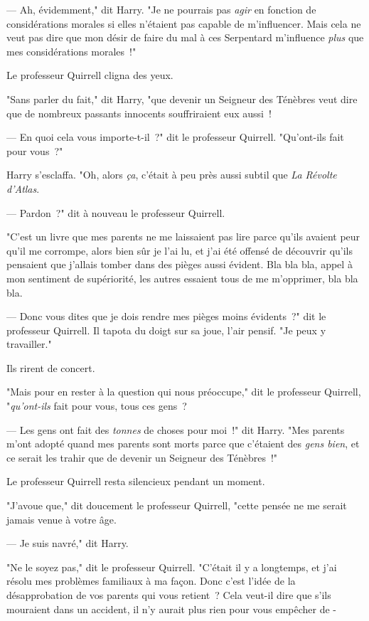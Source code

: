 --- Ah, évidemment," dit Harry. "Je ne pourrais pas \emph{agir} en fonction de considérations morales si elles n'étaient pas capable de m'influencer. Mais cela ne veut pas dire que mon désir de faire du mal à ces Serpentard m'influence \emph{plus} que mes considérations morales~!"

Le professeur Quirrell cligna des yeux.

"Sans parler du fait," dit Harry, "que devenir un Seigneur des Ténèbres veut dire que de nombreux passants innocents souffriraient eux aussi~!

--- En quoi cela vous importe-t-il~?" dit le professeur Quirrell. "Qu'ont-ils fait pour vous~?"

Harry s'esclaffa. "Oh, alors \emph{ça}, c'était à peu près aussi subtil que \emph{La Révolte d'Atlas}.

--- Pardon~?" dit à nouveau le professeur Quirrell.

"C'est un livre que mes parents ne me laissaient pas lire parce qu'ils avaient peur qu'il me corrompe, alors bien sûr je l'ai lu, et j'ai été offensé de découvrir qu'ils pensaient que j'allais tomber dans des pièges aussi évident. Bla bla bla, appel à mon sentiment de supériorité, les autres essaient tous de me m'opprimer, bla bla bla.

--- Donc vous dites que je dois rendre mes pièges moins évidents~?" dit le professeur Quirrell. Il tapota du doigt sur sa joue, l'air pensif. "Je peux y travailler."

Ils rirent de concert.

"Mais pour en rester à la question qui nous préoccupe," dit le professeur Quirrell, "\emph{qu'ont-ils} fait pour vous, tous ces gens~?

--- Les gens ont fait des \emph{tonnes} de choses pour moi~!" dit Harry. "Mes parents m'ont adopté quand mes parents sont morts parce que c'étaient des \emph{gens bien}, et ce serait les trahir que de devenir un Seigneur des Ténèbres~!"

Le professeur Quirrell resta silencieux pendant un moment.

"J'avoue que," dit doucement le professeur Quirrell, "cette pensée ne me serait jamais venue à votre âge.

--- Je suis navré," dit Harry.

"Ne le soyez pas," dit le professeur Quirrell. "C'était il y a longtemps, et j'ai résolu mes problèmes familiaux à ma façon. Donc c'est l'idée de la désapprobation de vos parents qui vous retient~? Cela veut-il dire que s'ils mouraient dans un accident, il n'y aurait plus rien pour vous empêcher de -


